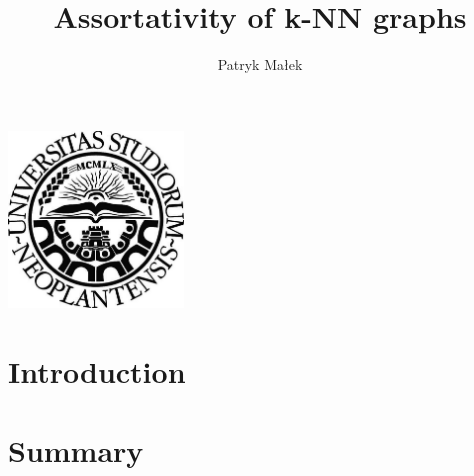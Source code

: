 \documentclass[a4paper,11pt]{article}
\newcommand{\mahtitle}{Assortativity of k-NN graphs}
\begin{document}
\label{Title} 
\title{\vspace{1pc} \mahtitle \vspace{4pc}}
\author{Patryk Małek \vspace{-0.7pc}}
\date{}
\maketitle
\thispagestyle{empty}


\vspace{6pc}
\centerline{
\includegraphics[width=0.35\textwidth,height=0.35\textheight,keepaspectratio]{NoviSadLogoGray.jpg}
}
\vspace{8pc}

\clearpage
\begin{abstract}
\label{Abstract}

\end{abstract}




\pagebreak
\section{Introduction} 



\clearpage
\section{Summary} 

\end{document}
